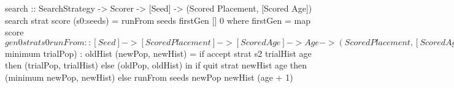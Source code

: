 search :: SearchStrategy -> Scorer -> [Seed]
       -> (Scored Placement, [Scored Age])
search strat score (s0:seeds) = runFrom seeds firstGen [] 0
 where
  firstGen = map score $ gen0 strat s0
  runFrom :: [Seed] -> [Scored Placement] -> [Scored Age]
          -> Age -> (Scored Placement, [Scored Age])
  runFrom (s1:s2:seeds) oldPop oldHist age =
    let trialPop  = nextGen strat s1 score oldPop
        trialHist = (fmap (const age) $ minimum trialPop)
                  : oldHist
        (newPop, newHist) =
          if accept strat s2 trialHist age then
            (trialPop, trialHist)
          else
            (oldPop, oldHist)
    in  if quit strat newHist age then
          (minimum newPop, newHist)
        else
          runFrom seeds newPop newHist (age + 1)
